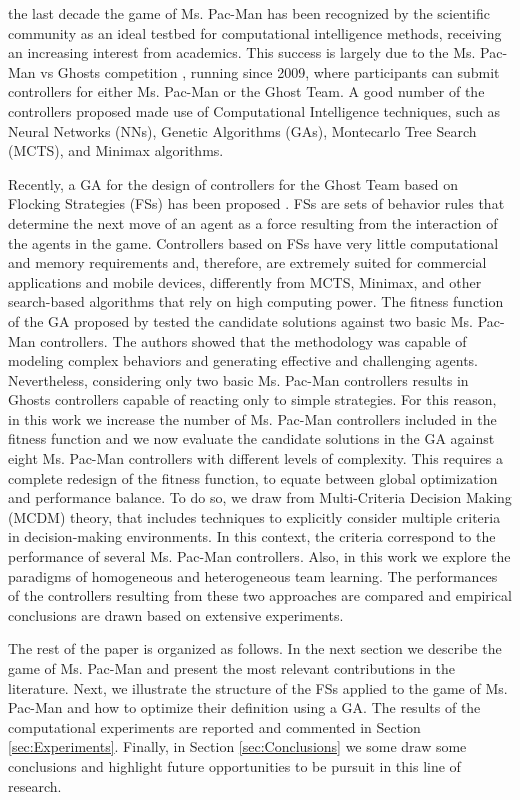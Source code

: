 \documentclass[journal]{IEEEtran}
\begin{document}
 the last decade the game of Ms. Pac-Man has been recognized by the scientific community as an ideal testbed for computational intelligence methods, receiving an increasing interest from academics. This success is largely due to the Ms. Pac-Man vs Ghosts competition \cite{Lucas2009,MsPacManVSGhost2011}, running since 2009, where participants can submit controllers for either Ms. Pac-Man or the Ghost Team. A good number of the controllers proposed made use of Computational Intelligence techniques, such as Neural Networks (NNs), Genetic Algorithms (GAs), Montecarlo Tree Search (MCTS), and Minimax algorithms.

Recently, a GA for the design of controllers for the Ghost Team based on Flocking Strategies (FSs) has been proposed \cite{Liberatore2014}. FSs are sets of behavior rules that determine the next move of an agent as a force resulting from the interaction of the agents in the game. Controllers based on FSs have very little computational and memory requirements and, therefore, are extremely suited for commercial applications and mobile devices, differently from MCTS, Minimax, and other search-based algorithms that rely on high computing power. The fitness function of the GA proposed by \cite{Liberatore2014} tested the candidate solutions against two basic Ms. Pac-Man controllers. The authors showed that the methodology was capable of modeling complex behaviors and generating effective and challenging agents. Nevertheless, considering only two basic Ms. Pac-Man controllers results in Ghosts controllers capable of reacting only to simple strategies. For this reason, in this work we increase the number of Ms. Pac-Man controllers included in the fitness function and we now evaluate the candidate solutions in the GA against eight Ms. Pac-Man controllers with different levels of complexity. This requires a complete redesign of the fitness function, to equate between global optimization and performance balance. To do so, we draw from Multi-Criteria Decision Making (MCDM) theory, that includes techniques to explicitly consider multiple criteria in decision-making environments. In this context, the criteria correspond to the performance of several Ms. Pac-Man controllers.  Also, in this work we explore the paradigms of homogeneous and heterogeneous team learning. The performances of the controllers resulting from these two approaches are compared and empirical conclusions are drawn based on extensive experiments. 

The rest of the paper is organized as follows. In the next section we describe the game of Ms. Pac-Man and present the most relevant contributions in the literature. Next, we illustrate the structure of the FSs applied to the game of Ms. Pac-Man and how to optimize their definition using a GA. The results of the computational experiments are reported and commented in Section \ref{sec:Experiments}. Finally, in Section \ref{sec:Conclusions} we some draw some conclusions and highlight future opportunities to be pursuit in this line of research.
\end{document}
